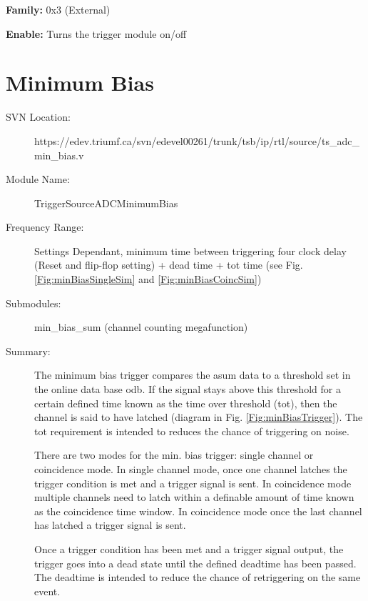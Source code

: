 \begin{description}
\item \textbf{Family: } 0x3 (External)

\item \textbf{Enable: }Turns the trigger module on/off
\end{description}

\section{Minimum Bias}
\label{sec:minBias}
\begin{description}
\item[SVN Location:] https://edev.triumf.ca/svn/edevel00261/trunk/tsb/ip/rtl/source/ts\_adc\_min\_bias.v
\item[Module Name: ]TriggerSourceADCMinimumBias
\item[Frequency Range: ]Settings Dependant, minimum time between triggering four clock delay (Reset and flip-flop setting) + dead time + \gls{tot} time (see Fig. \ref{Fig:minBiasSingleSim} and \ref{Fig:minBiasCoincSim})
\item[Submodules: ]min\_bias\_sum (channel counting megafunction)
\item[Summary: ]The minimum bias trigger compares the \gls{asum} data to a threshold set in the online data base \gls{odb}. If the signal stays above this threshold for a certain defined time known as the time over threshold (\gls{tot}), then the channel is said to have latched (diagram in Fig. \ref{Fig:minBiasTrigger}). The \gls{tot} requirement is intended to reduces the chance of triggering on noise.

There are two modes for the min. bias trigger: single channel or coincidence mode. In single channel mode, once one channel latches the trigger condition is met and a trigger signal is sent. In coincidence mode multiple channels need to latch within a definable amount of time known as the coincidence time window. In coincidence mode once the last channel has latched a trigger signal is sent. 

Once a trigger condition has been met and a trigger signal output, the trigger goes into a dead state until the defined deadtime has been passed. The deadtime is intended to reduce the chance of retriggering on the same event.
 
\end{description}

